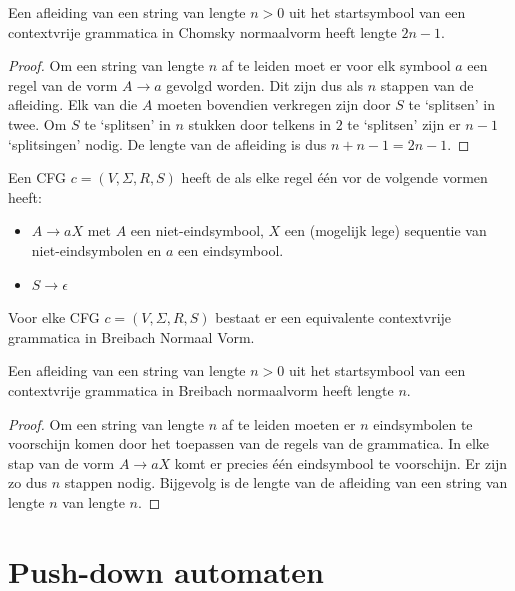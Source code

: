 \documentclass[main.tex]{subfiles}
\begin{document}
\begin{st}
  Een afleiding van een string van lengte $n>0$ uit het startsymbool van een contextvrije grammatica in Chomsky normaalvorm heeft lengte $2n-1$.
  \begin{proof}
    Om een string van lengte $n$ af te leiden moet er voor elk symbool $a$ een regel van de vorm $A \rightarrow a$ gevolgd worden.
    Dit zijn dus als $n$ stappen van de afleiding.
    Elk van die $A$ moeten bovendien verkregen zijn door $S$ te `splitsen' in twee.
    Om $S$ te `splitsen' in $n$ stukken door telkens in $2$ te `splitsen' zijn er $n-1$ `splitsingen' nodig.
    De lengte van de afleiding is dus $n + n - 1 = 2n-1$.
  \end{proof}
\end{st}

\begin{de}
  Een CFG $c = (V,\Sigma,R,S)$ heeft de  als elke regel \'e\'en vor de volgende vormen heeft:
  \begin{itemize}
  \item $A \rightarrow aX$ met $A$ een niet-eindsymbool, $X$ een (mogelijk lege) sequentie van niet-eindsymbolen en $a$ een eindsymbool.
  \item $S \rightarrow \epsilon$
  \end{itemize}
\end{de}

\begin{st}
  Voor elke CFG $c = (V,\Sigma,R,S)$ bestaat er een equivalente contextvrije grammatica in Breibach Normaal Vorm.
 
\end{st}

\begin{st}
  Een afleiding van een string van lengte $n>0$ uit het startsymbool van een contextvrije grammatica in Breibach normaalvorm heeft lengte $n$.
 
  \begin{proof}
    Om een string van lengte $n$ af te leiden moeten er $n$ eindsymbolen te voorschijn komen door het toepassen van de regels van de grammatica.
    In elke stap van de vorm $A \rightarrow aX$ komt er precies \'e\'en eindsymbool te voorschijn.
    Er zijn zo dus $n$ stappen nodig. Bijgevolg is de lengte van de afleiding van een string van lengte $n$ van lengte $n$.
  \end{proof}
\end{st}


\section{Push-down automaten}
\label{sec:push-down-automaten}
\end{document}
